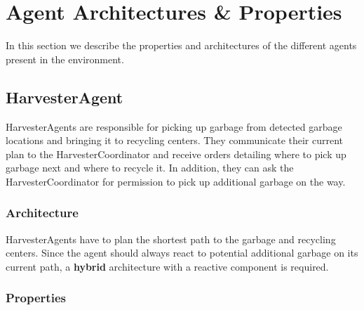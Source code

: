 \section{Agent Architectures \& Properties}

In this section we describe the properties and architectures of the different agents present in the environment.

\subsection{HarvesterAgent}

HarvesterAgents are responsible for picking up garbage from detected garbage locations and bringing it to recycling centers. They communicate their current plan to the HarvesterCoordinator and receive orders detailing where to pick up garbage next and where to recycle it. In addition, they can ask the HarvesterCoordinator for permission to pick up additional garbage on the way.

\subsubsection*{Architecture}

HarvesterAgents have to plan the shortest path to the garbage and recycling centers. Since the agent should always react to potential additional garbage on its current path, a \textbf{hybrid} architecture with a reactive component is required.

\subsubsection*{Properties}

